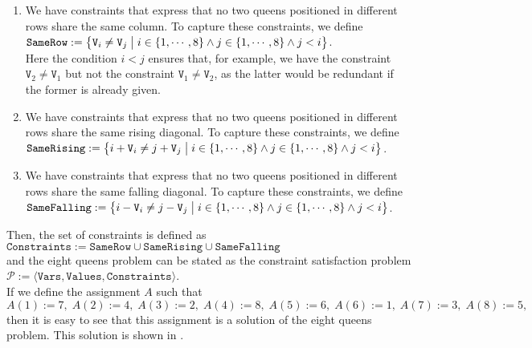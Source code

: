 \begin{enumerate}
\item We have constraints that express that no two queens positioned in different rows share the same column.
      To capture these constraints, we define
      \\[0.2cm]
      \hspace*{1.3cm}
      $\mathtt{SameRow} := \bigl\{ \mathtt{V}_i \not= \mathtt{V}_j \bigm| i \in \{1,\cdots,8\} \wedge j \in \{1,\cdots,8\} \wedge j < i \bigr\}$.
      \\[0.2cm]
      Here the condition $i < j$ ensures that, for example, we have the constraint $\mathtt{V}_2 \not= \mathtt{V}_1$
      but not the constraint  $\mathtt{V}_1 \not= \mathtt{V}_2$, as the latter would be redundant if the former is
      already given.
\item We have constraints that express that no two queens positioned in different rows share the same rising
      diagonal.  To capture these constraints, we define
      \\[0.2cm]
      \hspace*{1.3cm}
      $\mathtt{SameRising} := \bigl\{ i + \mathtt{V}_i \not= j + \mathtt{V}_j \bigm| i \in \{1,\cdots,8\} \wedge j \in \{1,\cdots,8\} \wedge j < i \bigr\}$.
\item We have constraints that express that no two queens positioned in different rows share the same falling
      diagonal.  To capture these constraints, we define
      \\[0.2cm]
      \hspace*{1.3cm}
      $\mathtt{SameFalling} := \bigl\{ i - \mathtt{V}_i \not= j - \mathtt{V}_j \bigm| i \in \{1,\cdots,8\} \wedge j \in \{1,\cdots,8\} \wedge j < i \bigr\}$.
\end{enumerate}
Then, the set of constraints is defined as 
\\[0.2cm]
\hspace*{1.3cm}
$\mathtt{Constraints} := \mathtt{SameRow} \cup \mathtt{SameRising} \cup \mathtt{SameFalling}$
\\[0.2cm]
and the eight queens problem can be stated as the constraint satisfaction problem
\\[0.2cm]
\hspace*{1.3cm}
$\mathcal{P} := \langle \mathtt{Vars}, \mathtt{Values}, \mathtt{Constraints} \rangle$.
\\[0.2cm]
If we define the assignment $A$ such that
\\[0.2cm]
\hspace*{1.3cm}
$A(1) := 7,\; A(2) := 4,\; A(3) := 2,\; A(4) := 8,\; A(5) := 6,\; A(6) := 1,\; A(7) := 3,\; A(8) := 5,$
\\[0.2cm]
then it is easy to see that this assignment is a solution of the eight queens problem.  This solution is shown
in .


